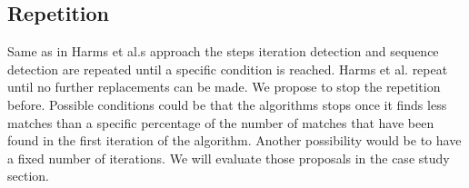 \subsection{Repetition}
Same as in Harms et al.s approach the steps iteration detection and sequence detection are repeated until a specific condition is reached. 
Harms et al. repeat until no further replacements can be made. 
We propose to stop the repetition before. 
Possible conditions could be that the algorithms stops once it finds less matches than a specific percentage of the number of matches that have been found in the first iteration of the algorithm.
Another possibility would be to have a fixed number of iterations.
We will evaluate those proposals in the case study section.


